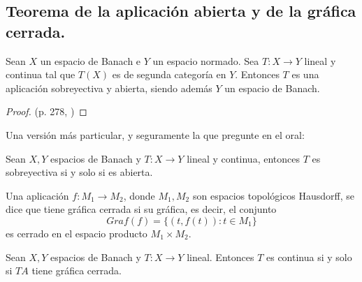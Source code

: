 \subsection{Teorema de la aplicación abierta y de la gráfica cerrada.}

\begin{theorem}
  \label{th:open-map}
  Sean $X$ un espacio de Banach e $Y$ un espacio normado. Sea $T:X\to Y$ lineal
  y continua tal que $T(X)$ es de segunda categoría en $Y$. Entonces $T$ es una
  aplicación sobreyectiva y abierta, siendo además $Y$ un espacio de Banach.
\end{theorem}

\begin{proof}(p. 278, \cite{cascales2012})
  
\end{proof}

Una versión más particular, y seguramente la que pregunte en el oral:
\begin{corollary}
  \label{cor:open-map}
  Sean $X,Y$ espacios de Banach y $T:X\to Y$ lineal y continua, entonces $T$ es
  sobreyectiva si y solo si es abierta.
\end{corollary}

\begin{definition}
  Una aplicación $f:M_1\to M_2$, donde $M_1,M_2$ son espacios topológicos
  Hausdorff, se dice que tiene gráfica cerrada si su gráfica, es decir, el
  conjunto
  \[
  Graf(f)=\{(t,f(t)):t\in M_1\} 
  \] 
  es cerrado en el espacio producto $M_1\times M_2$.
\end{definition}

\begin{theorem}
  Sean $X,Y$ espacios de Banach y $T:X\to Y$ lineal. Entonces $T$ es continua si
  y solo si $TA$ tiene gráfica cerrada.
\end{theorem}

